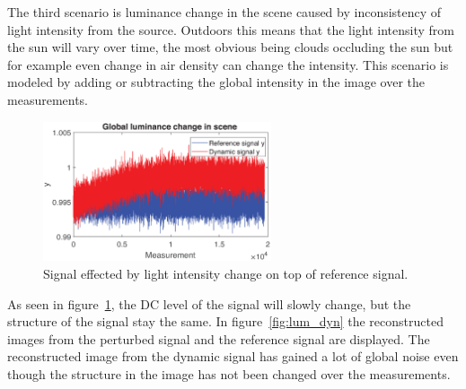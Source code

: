 



The third scenario is luminance change in the scene caused by inconsistency of light intensity from the source. Outdoors this means that the light intensity from the sun will vary over time, the most obvious being clouds occluding the sun but for example even change in air density can change the intensity. This scenario is modeled by adding or subtracting the global intensity in the image over the measurements. 

\begin{figure}[H]
    \includegraphics[width=0.6\textwidth]{result/dynamic/lum/intense_change1.eps}
    \caption{Signal effected by light intensity change on top of reference signal.}
    \label{fig:lum_sig_1}
\end{figure}

As seen in figure~\ref{fig:lum_sig_1}, the DC level of the signal will slowly change, but the structure of the signal stay the same. In figure~\ref{fig:lum_dyn} the reconstructed images from the perturbed signal and the reference signal are displayed. The reconstructed image from the dynamic signal has gained a lot of global noise even though the structure in the image has not been changed over the measurements.  


